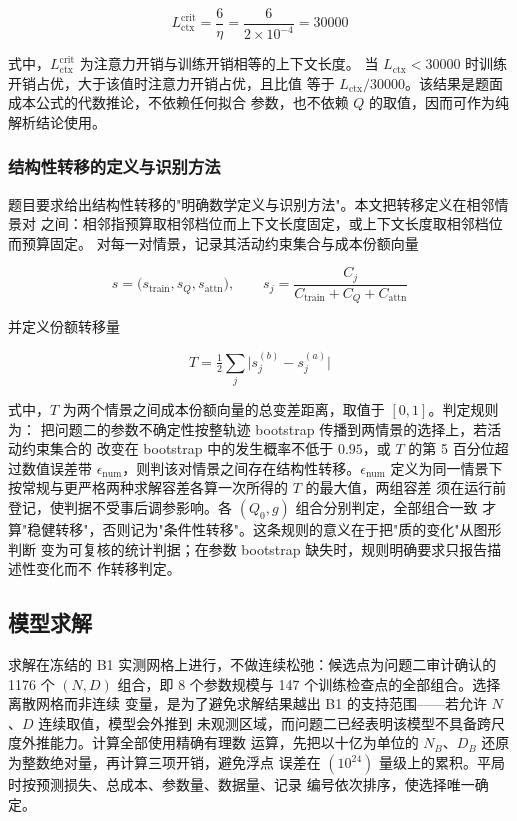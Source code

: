 \documentclass[bwprint]{gmcmthesis}
\numberwithin{equation}{section}
\numberwithin{figure}{section}
\numberwithin{table}{section}
\begin{document}
\begin{equation}
L_{\mathrm{ctx}}^{\mathrm{crit}}=\frac{6}{\eta}=\frac{6}{2\times10^{-4}}=30000
\end{equation}

式中，$L_{\mathrm{ctx}}^{\mathrm{crit}}$ 为注意力开销与训练开销相等的上下文长度。
当 $L_{\mathrm{ctx}}<30000$ 时训练开销占优，大于该值时注意力开销占优，且比值
等于 $L_{\mathrm{ctx}}/30000$。该结果是题面成本公式的代数推论，不依赖任何拟合
参数，也不依赖 $Q$ 的取值，因而可作为纯解析结论使用。

\subsubsection{结构性转移的定义与识别方法}

题目要求给出结构性转移的"明确数学定义与识别方法"。本文把转移定义在相邻情景对
之间：相邻指预算取相邻档位而上下文长度固定，或上下文长度取相邻档位而预算固定。
对每一对情景，记录其活动约束集合与成本份额向量

\begin{equation}
s=\bigl(s_{\mathrm{train}},s_Q,s_{\mathrm{attn}}\bigr),\qquad
s_j=\frac{C_j}{C_{\mathrm{train}}+C_Q+C_{\mathrm{attn}}}
\end{equation}

并定义份额转移量

\begin{equation}
T=\tfrac12\sum_{j}\bigl|s_j^{(b)}-s_j^{(a)}\bigr|
\end{equation}

式中，$T$ 为两个情景之间成本份额向量的总变差距离，取值于 $[0,1]$。判定规则为：
把问题二的参数不确定性按整轨迹 bootstrap 传播到两情景的选择上，若活动约束集合的
改变在 bootstrap 中的发生概率不低于 $0.95$，或 $T$ 的第 5 百分位超过数值误差带
$\epsilon_{\mathrm{num}}$，则判该对情景之间存在结构性转移。$\epsilon_{\mathrm{num}}$
定义为同一情景下按常规与更严格两种求解容差各算一次所得的 $T$ 的最大值，两组容差
须在运行前登记，使判据不受事后调参影响。各 $(Q_0,g)$ 组合分别判定，全部组合一致
才算"稳健转移"，否则记为"条件性转移"。这条规则的意义在于把"质的变化"从图形判断
变为可复核的统计判据；在参数 bootstrap 缺失时，规则明确要求只报告描述性变化而不
作转移判定。

\subsection{模型求解}

求解在冻结的 B1 实测网格上进行，不做连续松弛：候选点为问题二审计确认的 1176 个
$(N,D)$ 组合，即 8 个参数规模与 147 个训练检查点的全部组合。选择离散网格而非连续
变量，是为了避免求解结果越出 B1 的支持范围——若允许 $N$、$D$ 连续取值，模型会外推到
未观测区域，而问题二已经表明该模型不具备跨尺度外推能力。计算全部使用精确有理数
运算，先把以十亿为单位的 $N_B$、$D_B$ 还原为整数绝对量，再计算三项开销，避免浮点
误差在 $(10^{24})$ 量级上的累积。平局时按预测损失、总成本、参数量、数据量、记录
编号依次排序，使选择唯一确定。
\end{document}
